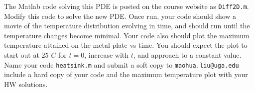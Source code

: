 \documentclass{article}
\begin{document}
\noindent
The Matlab code solving this PDE is posted on the course website as \texttt{Diff2D.m}. Modify this code to solve the new PDE. Once run, your code should show a movie of the temperature distribution evolving in time, and should run until the temperature changes become minimal. Your code also should plot the maximum temperature attained on the metal plate vs time. You should expect the plot to start out at $25^{\circ}C$ for $t = 0$, increase with $t$, and approach to a constant value. Name your code \texttt{heatsink.m} and submit a soft copy to \texttt{maohua.liu@uga.edu} include a hard copy of your code and the maximum temperature plot with your HW solutions.
\end{document}
